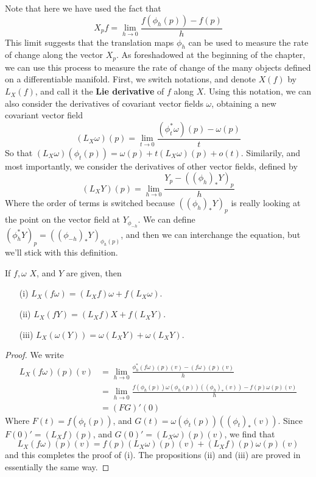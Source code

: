 Note that here we have used the fact that
%
\[ X_p f = \lim_{h \to 0} \frac{f(\phi_h(p)) - f(p)}{h} \]
%
This limit suggests that the translation maps $\phi_h$ can be used to measure the rate of change along the vector $X_p$. As foreshadowed at the beginning of the chapter, we can use this process to measure the rate of change of the many objects defined on a differentiable manifold. First, we switch notations, and denote $X(f)$ by $L_X(f)$, and call it the {\bf Lie derivative} of $f$ along $X$. Using this notation, we can also consider the derivatives of covariant vector fields $\omega$, obtaining a new covariant vector field
%
\[ (L_X \omega)(p) = \lim_{t \to 0} \frac{(\phi_t^*\omega)(p) - \omega(p)}{t} \]
%
So that $(L_X \omega)(\phi_t(p)) = \omega(p) + t (L_X \omega)(p) + o(t)$. Similarily, and most importantly, we consider the derivatives of other vector fields, defined by
%
\[ (L_X Y)(p) = \lim_{h \to 0} \frac{Y_p - ((\phi_h)_* Y)_p}{h} \]
%
Where the order of terms is switched because $((\phi_h)_* Y)_p$ is really looking at the point on the vector field at $Y_{\phi_{-h}}$. We can define $(\phi_h^* Y)_p = ((\phi_{-h})_* Y)_{\phi_h(p)}$, and then we can interchange the equation, but we'll stick with this definition.

\begin{theorem}
    If $f, \omega$ $X$, and $Y$ are given, then
    \begin{itemize}
        \item[(i)] $L_X(f \omega) = (L_X f) \omega + f (L_X \omega)$.
        \item[(ii)] $L_X(f Y) = (L_X f) X + f (L_X Y)$.
        \item[(iii)] $L_X(\omega(Y)) = \omega(L_X Y) + \omega(L_X Y)$.
    \end{itemize}
\end{theorem}
\begin{proof}
    We write
    \begin{align*}
        L_X(f \omega)(p)(v) &= \lim_{h \to 0} \frac{\phi_h^*(f \omega)(p)(v) - (f \omega)(p)(v)}{h}\\
        &= \lim_{h \to 0} \frac{f(\phi_h(p)) \omega(\phi_h(p))((\phi_h)_*(v)) - f(p) \omega(p)(v)}{h}\\
        &= (FG)'(0)
    \end{align*}
    Where $F(t) = f(\phi_t(p))$, and $G(t) = \omega(\phi_t(p))((\phi_t)_*(v))$. Since $F(0)' = (L_X f)(p)$, and $G(0)' = (L_X \omega)(p)(v)$, we find that
    \[ L_X(f \omega)(p)(v) = f(p) (L_X \omega)(p)(v) + (L_X f)(p) \omega(p)(v) \]
    and this completes the proof of (i). The propositions (ii) and (iii) are proved in essentially the same way.
\end{proof}


